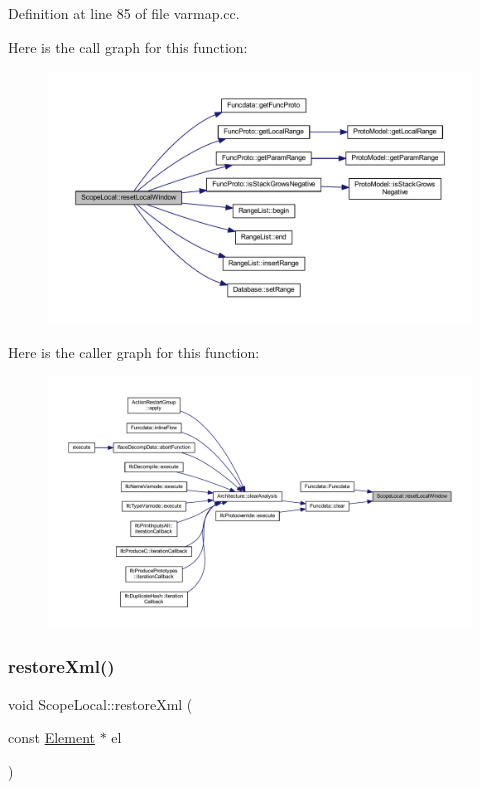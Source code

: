 Definition at line 85 of file varmap.\+cc.

Here is the call graph for this function\+:
\nopagebreak
\begin{figure}[H]
\begin{center}
\leavevmode
\includegraphics[width=350pt]{class_scope_local_a3bf9941188eb64423d2ed49a08dab8ca_cgraph}
\end{center}
\end{figure}
Here is the caller graph for this function\+:
\nopagebreak
\begin{figure}[H]
\begin{center}
\leavevmode
\includegraphics[width=350pt]{class_scope_local_a3bf9941188eb64423d2ed49a08dab8ca_icgraph}
\end{center}
\end{figure}
\mbox{\label{class_scope_local_a5eeb1756bc706b8d5211fda106ad82ae}} 
\subsubsection{\texorpdfstring{restoreXml()}{restoreXml()}}
{\footnotesize\ttfamily void Scope\+Local\+::restore\+Xml (\begin{DoxyParamCaption}\item[{const \mbox{\hyperlink{class_element}{Element}} $\ast$}]{el }\end{DoxyParamCaption})\hspace{0.3cm}{\ttfamily [virtual]}}



